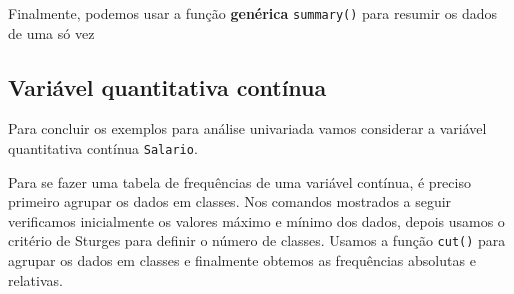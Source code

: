 \documentclass[
  10pt,
  a4paper]{book}
\newenvironment{Shaded}{\begin{snugshade}}{\end{snugshade}}
\newcommand{\FunctionTok}[1]{\textcolor[rgb]{0.00,0.00,0.00}{#1}}
\newcommand{\NormalTok}[1]{#1}
\newcommand{\SpecialCharTok}[1]{\textcolor[rgb]{0.00,0.00,0.00}{#1}}
\newcommand{\StringTok}[1]{\textcolor[rgb]{0.31,0.60,0.02}{#1}}
\begin{document}
Finalmente, podemos usar a função \textbf{genérica} \texttt{summary()} para resumir
os dados de uma só vez

\begin{Shaded}
\end{Shaded}

\hypertarget{variuxe1vel-quantitativa-contuxednua}{%
\subsection{Variável quantitativa contínua}\label{variuxe1vel-quantitativa-contuxednua}}

Para concluir os exemplos para análise univariada vamos considerar a
variável quantitativa contínua \texttt{Salario}.

Para se fazer uma tabela de frequências de uma variável contínua, é preciso
primeiro agrupar os dados em classes. Nos comandos mostrados a seguir
verificamos inicialmente os valores máximo e mínimo dos dados, depois
usamos o critério de Sturges para definir o número de classes. Usamos
a função \texttt{cut()} para agrupar os dados em classes e finalmente obtemos
as frequências absolutas e relativas.
\end{document}

